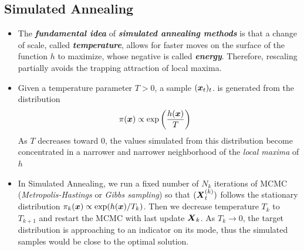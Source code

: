 \documentclass[11pt]{article}
\begin{document}
\subsection{Simulated Annealing}
\begin{itemize}
\item The \emph{\textbf{fundamental idea}} of \emph{\textbf{simulated annealing methods}} is that a change of scale, called \emph{\textbf{temperature}}, allows for faster moves on the surface of the function $h$ to maximize, whose negative is called \emph{\textbf{energy}}. Therefore, rescaling partially avoids the trapping attraction of local maxima.

\item Given a temperature parameter $T > 0$, a sample $(\boldsymbol{x}_{t})_t$. is generated from the distribution
\begin{align}
\pi(\boldsymbol{x}) &\propto \exp\left(\frac{h(\boldsymbol{x})}{T}\right)
\end{align} As $T$ decreases toward $0$, the values simulated from this distribution become concentrated in a narrower and narrower neighborhood of the \emph{local maxima} of $h$

\item In Simulated Annealing, we run a fixed number of $N_k$ iterations of MCMC (\emph{Metropolis-Hastings} or \emph{Gibbs sampling}) so that $(\boldsymbol{X}^{(k)}_t)$ follows the stationary distribution $\pi_k(\boldsymbol{x}) \propto \exp(h(\boldsymbol{x})/T_{k})$. Then we decrease temperature $T_{k}$ to $T_{k+1}$ and restart the MCMC with last update $\boldsymbol{X}_{k}$. As $T_{k}\rightarrow 0$, the target distribution is approaching to an indicator on its mode, thus the simulated samples would be close to the optimal solution.



\end{itemize}
\end{document}
